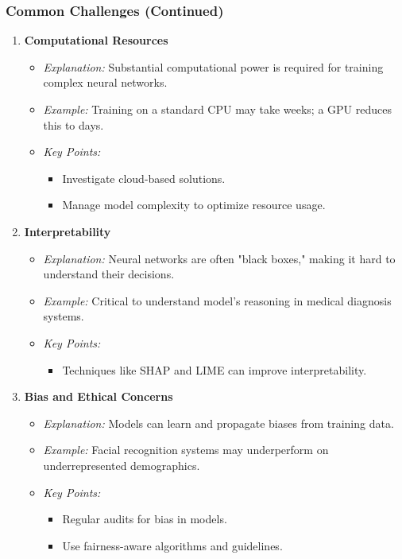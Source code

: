 \documentclass[aspectratio=169]{beamer}
\begin{document}
\begin{frame}[fragile]
    \frametitle{Common Challenges (Continued)}
    \begin{enumerate}[resume]
        \item \textbf{Computational Resources}
            \begin{itemize}
                \item \textit{Explanation:} Substantial computational power is required for training complex neural networks.
                \item \textit{Example:} Training on a standard CPU may take weeks; a GPU reduces this to days.
                \item \textit{Key Points:}
                    \begin{itemize}
                        \item Investigate cloud-based solutions.
                        \item Manage model complexity to optimize resource usage.
                    \end{itemize}
            \end{itemize}
        \item \textbf{Interpretability}
            \begin{itemize}
                \item \textit{Explanation:} Neural networks are often "black boxes," making it hard to understand their decisions.
                \item \textit{Example:} Critical to understand model's reasoning in medical diagnosis systems.
                \item \textit{Key Points:}
                    \begin{itemize}
                        \item Techniques like SHAP and LIME can improve interpretability.
                    \end{itemize}
            \end{itemize}
        \item \textbf{Bias and Ethical Concerns}
            \begin{itemize}
                \item \textit{Explanation:} Models can learn and propagate biases from training data.
                \item \textit{Example:} Facial recognition systems may underperform on underrepresented demographics.
                \item \textit{Key Points:}
                    \begin{itemize}
                        \item Regular audits for bias in models.
                        \item Use fairness-aware algorithms and guidelines.
                    \end{itemize}
            \end{itemize}
    \end{enumerate}
\end{frame}
\end{document}
